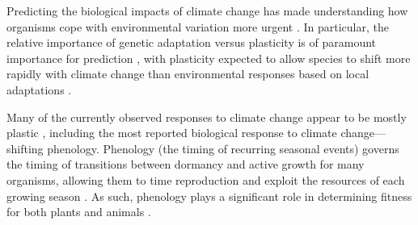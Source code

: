 \documentclass{article}
\begin{document}
Predicting the biological impacts of climate change has made understanding how organisms cope with environmental variation more urgent \citep{botero15}. In particular, the relative importance of genetic adaptation versus plasticity is of paramount importance for prediction \citep{chevin10}, with plasticity expected to allow species to shift more rapidly with climate change than environmental responses based on local adaptations \citep{chevin102, snell18}.


Many of the currently observed responses to climate change appear to be mostly plastic \citep{burton22,zettle21,bonamour19, king17}, including the most reported biological response to climate change---shifting phenology. Phenology (the timing of recurring seasonal events) governs the timing of transitions between dormancy and active growth for many organisms, allowing them to time reproduction and exploit the resources of each growing season \citep{chuine10,hanninen11,rytteri21,posle18}. As such, phenology plays a significant role in determining fitness for both plants \citep{guo22,chuine01} and animals \citep{wann19,renner18,chu17}. 
\end{document}
